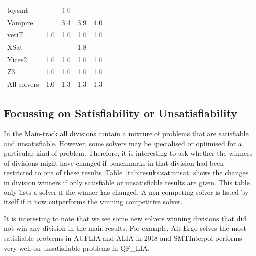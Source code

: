 \documentclass[dvipsnames,table,twoside,11pt]{article}
\begin{document}
\begin{table}
\begin{tabular}{lrrrr}
    toysmt            &     & \textcolor{gray}{1.0} &     &     \\
    Vampire           &     & 3.4 & 3.9 & 4.0 \\
    veriT             & \textcolor{gray}{1.0} & \textcolor{gray}{1.0} & \textcolor{gray}{1.0} & \textcolor{gray}{1.0} \\
    XSat              &     &     & 1.8 &     \\
    Yices2            & \textcolor{gray}{1.0} & \textcolor{gray}{1.0} & \textcolor{gray}{1.0} & \textcolor{gray}{1.0} \\
    Z3                & \textcolor{gray}{1.0} & \textcolor{gray}{1.0} & \textcolor{gray}{1.0} & \textcolor{gray}{1.0} \\
    \midrule
    All solvers       & 1.0 & 1.3 & 1.3 & 1.3 \\
    \bottomrule
  \end{tabular}
\end{table}

\subsection{Focussing on Satisfiability or Unsatisfiability} 

In the Main-track all divisions contain a mixture of problems that are satisfiable and unsatisfiable. However, some solvers may be specialised or optimised for a particular kind of problem. Therefore, it is interesting to ask whether the winners of divisions might have changed if benchmarks in that division had been restricted to one of these results. Table~\ref{tab:results:sat:unsat} shows the changes in division winners if only satisfiable or unsatisfiable results are given. This table only lists a solver if the winner has changed. A non-competing solver is listed by itself if it now outperforms the winning competitive solver.

It is interesting to note that we see some new solvers winning divisions that did not win any division in the main results. For example, Alt-Ergo solves the most satisfiable problems in AUFLIA and ALIA in 2018 and SMTInterpol performs very well on unsatisfiable problems in QF\_LIA.
\end{document}
